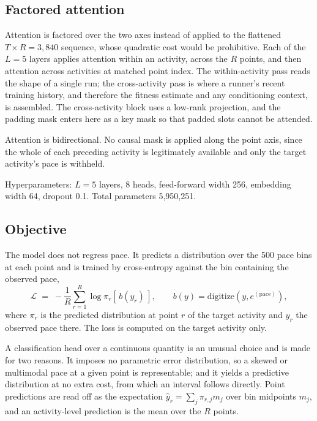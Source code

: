\subsection{Factored attention}

Attention is factored over the two axes instead of applied to the flattened $T \times R = 3{,}840$
sequence, whose quadratic cost would be prohibitive. Each of the $L = 5$ layers applies attention
within an activity, across the $R$ points, and then attention across activities at matched point
index. The within-activity pass reads the shape of a single run; the cross-activity pass is where a
runner's recent training history, and therefore the fitness estimate and any conditioning context,
is assembled. The cross-activity block uses a low-rank projection, and the padding mask enters here
as a key mask so that padded slots cannot be attended.

Attention is bidirectional. No causal mask is applied along the point axis, since the whole of each
preceding activity is legitimately available and only the target activity's pace is withheld.

Hyperparameters: $L = 5$ layers, 8 heads, feed-forward width 256, embedding width 64, dropout 0.1.
Total parameters 5{,}950{,}251.

\subsection{Objective}

The model does not regress pace. It predicts a distribution over the 500 pace bins at each point and
is trained by cross-entropy against the bin containing the observed pace,
\begin{equation}
  \mathcal{L} \;=\; -\frac{1}{R}\sum_{r=1}^{R} \log \pi_{r}\!\left[\,b(y_{r})\,\right],
  \qquad b(y) = \mathrm{digitize}\!\left(y, e^{(\mathrm{pace})}\right),
\end{equation}
where $\pi_r$ is the predicted distribution at point $r$ of the target activity and $y_r$ the
observed pace there. The loss is computed on the target activity only.

A classification head over a continuous quantity is an unusual choice and is made for two reasons.
It imposes no parametric error distribution, so a skewed or multimodal pace at a given point is
representable; and it yields a predictive distribution at no extra cost, from which an interval
follows directly. Point predictions are read off as the expectation $\hat{y}_r = \sum_j \pi_{r,j}
m_j$ over bin midpoints $m_j$, and an activity-level prediction is the mean over the $R$ points.

